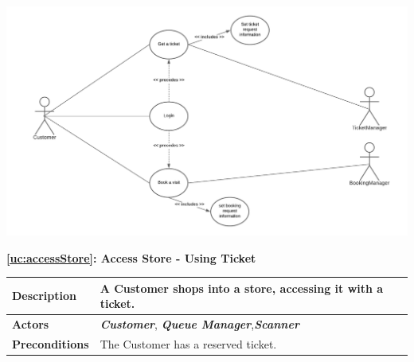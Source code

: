 \documentclass[a4paper, 12pt, oneside]{article}
\begin{document}
\begin{enumerate}[labelindent=20pt, label={UC.\arabic*}, itemindent=1em,leftmargin=!]
\begin{minipage}{\linewidth}
        \centering
           \includegraphics[height=0.33\textheight, scale=0.1, keepaspectratio]{img/book_ticket_use_diagram.png}
        \end{minipage}

\begin{center}
{\textbf{\ref{uc:accessStore}: Access Store - Using Ticket}}
\end{center}
\begin{tabularx}{\linewidth}{| l | X |}
	
	\hline
	\textbf{Description} & A Customer shops into a store, accessing it with a ticket.\\
	

	\hline
	\textbf{Actors} & \textbf{\textit{Customer}}, \textit{\textbf{Queue Manager}},\textit{\textbf{Scanner}} \\
	
	\hline
	\textbf{Preconditions} & The Customer has a reserved ticket.\\
	

\end{tabularx}
\end{enumerate}
\end{document}
